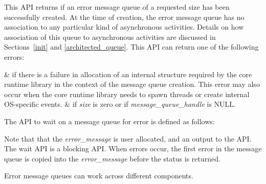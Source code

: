 This API returns  if an error message
queue of a requested size has been successfully created. At the time
of creation, the error message queue has no association to any
particular kind of asynchronous activities. Details on how
association of this queue to asynchronous activities are discussed
in Sections~\ref{init} and \ref{architected_queue}. This API can
return one of the following errors:

\begin{easylist}
&  if there is a failure
in allocation of an internal structure required by the core runtime
library in the context of the message queue creation. This error may
also occur when the core runtime library needs to spawn threads or
create internal OS-specific events. 
&  if {\itshape size}
is zero or if {\itshape message\_queue\_handle} is NULL.
\end{easylist}

The API to wait on a message queue for error is defined as follows:


Note that that the {\itshape error\_message} is user
allocated, and an output to the
 API.  The wait API is a
blocking API. When errors occur, the first error in the message
queue is copied into the {\itshape error\_message} before the status
is returned.

Error message queues can work across different components.
